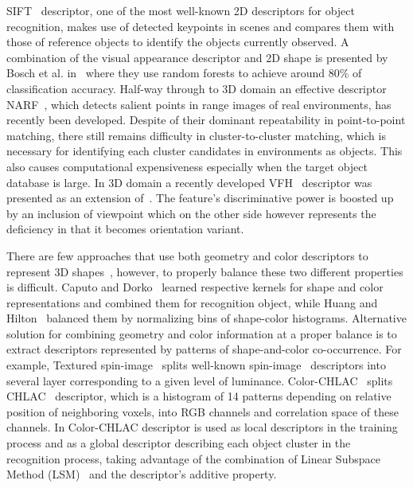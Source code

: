 \documentclass[conference]{sty/IEEEtran}
\begin{document}
SIFT~\cite{lowe04distinctive} descriptor, one of the most well-known 2D
descriptors for object recognition, makes use of detected keypoints in
scenes and compares them with those of reference objects to identify the
objects currently observed. A combination of the visual appearance
descriptor and 2D shape is presented by Bosch et al. in~\cite{Bosch07shape}
where they use random forests to achieve around 80\% of classification 
accuracy. Half-way through to 3D domain an effective descriptor
NARF~\cite{steder10irosws}, which detects salient points in range images of
real environments, has recently been developed.  Despite of their dominant
repeatability in point-to-point matching, there still remains difficulty in
cluster-to-cluster matching, which is necessary for identifying each cluster
candidates  in environments as objects. This also causes computational expensiveness
especially when the target object database is large. In 3D domain a recently 
developed VFH~\cite{vfh} descriptor was presented as an extension 
of~\cite{Rusu09ICRA}. The feature's discriminative power is boosted up
by an inclusion of viewpoint which on the other side however represents
the deficiency in that it becomes orientation variant. 

There are few approaches that use both geometry and color descriptors to
represent 3D shapes~\cite{park2006}, however, to properly balance these two
different properties is difficult.  Caputo and Dorko~\cite{caputo2002} learned
respective kernels for shape and color representations and combined them for
recognition object, while Huang and Hilton~\cite{huang2009} balanced them by
normalizing bins of shape-color histograms.  Alternative solution for combining
geometry and color information at a proper balance is to extract descriptors
represented by patterns of shape-and-color co-occurrence.  For example, Textured
spin-image~\cite{cortelazzo2006} splits well-known
spin-image~\cite{Johnson_spin_images} descriptors into several layer
corresponding to a given level of luminance. Color-CHLAC~\cite{kanezaki2010icra} 
splits CHLAC~\cite{kobayashi2004} descriptor, which is a histogram of 14 patterns 
depending on relative position of neighboring voxels, into RGB channels and correlation 
space of these channels.  In \cite{kanezaki2010icra} Color-CHLAC descriptor is used as local
descriptors in the training process and as a global descriptor describing each
object cluster in the recognition process, taking advantage of the combination
of Linear Subspace Method (LSM)~\cite{watanabe1973} and the descriptor's additive property.  
\end{document}
